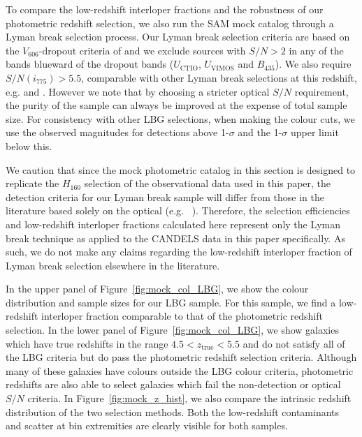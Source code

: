 To compare the low-redshift interloper fractions and the robustness of our photometric redshift selection, we also run the SAM mock catalog through a Lyman break selection process. Our Lyman break selection criteria are based on the $V_{606}$-dropout criteria of \citet{2012ApJ...754...83B} and we exclude sources with $S/N > 2$ in any of the bands blueward of the dropout bands ($U_{\text{CTIO}}$, $U_{\text{VIMOS}}$ and $B_{435}$). We also require $S/N(i_{775}) > 5.5$, comparable with other Lyman break selections at this redshift, e.g. \citet{Giavalisco:2004et} and \citet{2006AJ....132.1729B}. However we note that by choosing a stricter optical $S/N$ requirement, the purity of the sample can always be improved at the expense of total sample size. For consistency with other LBG selections, when making the colour cuts, we use the observed magnitudes for detections above 1-$\sigma$ and the 1-$\sigma$ upper limit below this.

We caution that since the mock photometric catalog in this section is designed to replicate the $H_{160}$ selection of the observational data used in this paper, the detection criteria for our Lyman break sample will differ from those in the literature based solely on the optical (e.g. \citeauthor{2007ApJ...670..928B}~\citeyear{2007ApJ...670..928B}). Therefore, the selection efficiencies and low-redshift interloper fractions calculated here represent only the Lyman break technique as applied to the CANDELS data in this paper specifically. As such, we do not make any claims regarding the low-redshift interloper fraction of Lyman break selection elsewhere in the literature.

In the upper panel of Figure~\ref{fig:mock_col_LBG}, we show the colour distribution and sample sizes for our LBG sample. For this sample, we find a low-redshift interloper fraction comparable to that of the photometric redshift selection. In the lower panel of Figure~\ref{fig:mock_col_LBG}, we show galaxies which have true redshifts in the range $4.5 < z_{\text{true}} < 5.5$ and do not satisfy all of the LBG criteria but do pass the photometric redshift selection criteria. Although many of these galaxies have colours outside the LBG colour criteria, photometric redshifts are also able to select galaxies which fail the non-detection or optical $S/N$ criteria. In Figure~\ref{fig:mock_z_hist}, we also compare the intrinsic redshift distribution of the two selection methods. Both the low-redshift contaminants and scatter at bin extremities are clearly visible for both samples.

